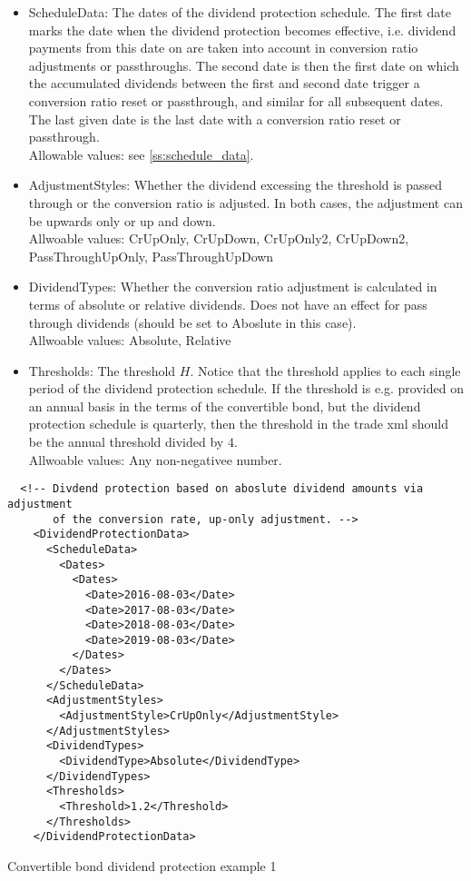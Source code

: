 \begin{itemize}
\item ScheduleData: The dates of the dividend protection schedule. The first date marks the date when the dividend
  protection becomes effective, i.e. dividend payments from this date on are taken into account in conversion ratio
  adjustments or passthroughs. The second date is then the first date on which the accumulated dividends between the
  first and second date trigger a conversion ratio reset or passthrough, and similar for all subsequent dates. The last
  given date is the last date with a conversion ratio reset or passthrough. \\ Allowable values: see
  \ref{ss:schedule_data}.
\item AdjustmentStyles: Whether the dividend excessing the threshold is passed through or the conversion ratio is
  adjusted. In both cases, the adjustment can be upwards only or up and down.\\
  Allwoable values: CrUpOnly, CrUpDown, CrUpOnly2, CrUpDown2, PassThroughUpOnly, PassThroughUpDown
\item DividendTypes: Whether the conversion ratio adjustment is calculated in terms of absolute or relative
  dividends. Does not have an effect for pass through dividends (should be set to Aboslute in this case).\\
  Allwoable values: Absolute, Relative
\item Thresholds: The threshold $H$. Notice that the threshold applies to each single period of the dividend protection
  schedule. If the threshold is e.g. provided on an annual basis in the terms of the convertible bond, but the dividend
  protection schedule is quarterly, then the threshold in the trade xml should be the annual threshold divided by
  $4$.\\
  Allwoable values: Any non-negativee number.
\end{itemize}

\begin{listing}[H]
\begin{verbatim}
  <!-- Divdend protection based on aboslute dividend amounts via adjustment
       of the conversion rate, up-only adjustment. -->
    <DividendProtectionData>
      <ScheduleData>
        <Dates>
          <Dates>
            <Date>2016-08-03</Date>
            <Date>2017-08-03</Date>
            <Date>2018-08-03</Date>
            <Date>2019-08-03</Date>
          </Dates>
        </Dates>
      </ScheduleData>
      <AdjustmentStyles>
        <AdjustmentStyle>CrUpOnly</AdjustmentStyle>
      </AdjustmentStyles>
      <DividendTypes>
        <DividendType>Absolute</DividendType>
      </DividendTypes>
      <Thresholds>
        <Threshold>1.2</Threshold>
      </Thresholds>
    </DividendProtectionData>
\end{verbatim}
\caption{Convertible bond dividend protection example 1}
\label{lst:convertiblebonddata_divprot_1}
\end{listing}

